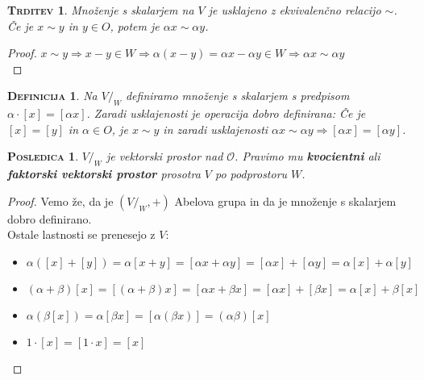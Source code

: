 \documentclass[a4paper,12pt]{article}
\newtheorem*{trditev}{\textsc{Trditev}}
\newtheorem*{posledica}{\textsc{Posledica}}
\newtheorem*{definicija}{\textsc{Definicija}}
\begin{document}
\begin{trditev}
Množenje s skalarjem na $V$ je usklajeno z ekvivalenčno relacijo $\sim$. Če je $x\sim y$ in $y\in O$, potem je $\alpha x \sim \alpha y$.\\
\end{trditev}

\begin{proof} 
	$x\sim y \Rightarrow x-y\in W \Rightarrow \alpha(x-y)=\alpha x-\alpha y\in W \Rightarrow \alpha x \sim \alpha y$ \\
\end{proof}

\begin{definicija}
	Na $V/_W$ definiramo množenje s skalarjem s predpisom $\alpha \cdot [x]=[\alpha x]$. Zaradi usklajenosti je operacija dobro definirana: Če je $[x]=[y]$ in $\alpha \in O$, je $x\sim y$ in zaradi usklajenosti $\alpha x \sim \alpha y \Rightarrow [\alpha x] = [\alpha y]$. \\
\end{definicija}

\begin{posledica}
	$V/_W$ je vektorski prostor nad $\mathcal{O}$. Pravimo mu \textbf{kvocientni} ali \linebreak  \textbf{faktorski vektorski prostor} prosotra $V$ po podprostoru $W$.\\
\end{posledica}

\begin{proof}
	Vemo že, da je $(V/_W,+)$ Abelova grupa in da je množenje s skalarjem dobro  \linebreak definirano. \\

	Ostale lastnosti se prenesejo z $V$:\\
	
	\begin{itemize}
		\item $\alpha([x]+[y])=\alpha [x+y]=[\alpha x + \alpha y]=[\alpha x]+[\alpha y]=\alpha[x] + \alpha [y]$
		\item $(\alpha + \beta)[x] = [(\alpha + \beta)x]=[\alpha x + \beta x]=[\alpha x]+[\beta x]=\alpha[x]+\beta[x]$
		\item $\alpha(\beta[x])=\alpha[\beta x]=[\alpha(\beta x)]=(\alpha \beta)[x]$
		\item $1\cdot [x]=[1\cdot x]=[x]$ \\
	\end{itemize}
\end{proof}
\end{document}
